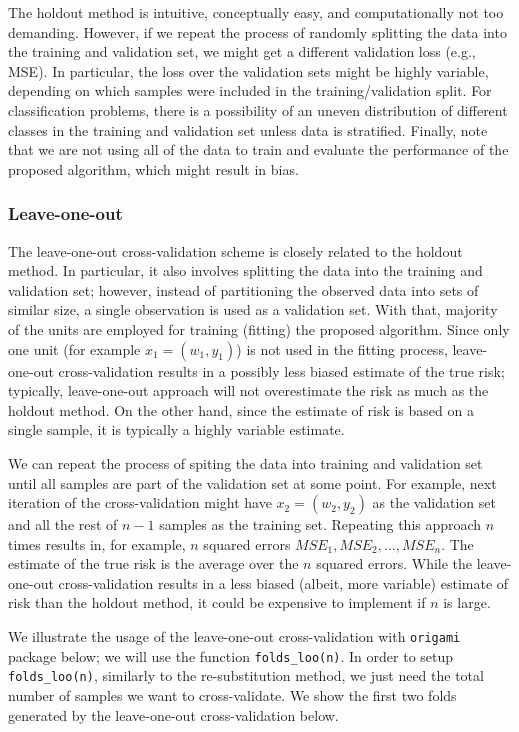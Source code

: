 \documentclass[12pt, krantz2,]{book}
\theoremstyle{definition}
\theoremstyle{definition}
\theoremstyle{definition}
\newcommand{\1}{\mathbbm{1}}
\begin{document}
The holdout method is intuitive, conceptually easy, and computationally not too
demanding. However, if we repeat the process of randomly splitting the data into
the training and validation set, we might get a different validation loss (e.g.,
MSE). In particular, the loss over the validation sets might be highly
variable, depending on which samples were included in the training/validation
split. For classification problems, there is a possibility of an uneven
distribution of different classes in the training and validation set unless data
is stratified. Finally, note that we are not using all of the data to train and
evaluate the performance of the proposed algorithm, which might result in bias.

\hypertarget{leave-one-out}{%
\subsubsection{Leave-one-out}\label{leave-one-out}}

The leave-one-out cross-validation scheme is closely related to the holdout
method. In particular, it also involves splitting the data into the training and
validation set; however, instead of partitioning the observed data into sets of
similar size, a single observation is used as a validation set. With that,
majority of the units are employed for training (fitting) the proposed
algorithm. Since only one unit (for example \(x_1 = (w_1, y_1)\)) is not used in
the fitting process, leave-one-out cross-validation results in a possibly less
biased estimate of the true risk; typically, leave-one-out approach will not
overestimate the risk as much as the holdout method. On the other hand, since
the estimate of risk is based on a single sample, it is typically a highly
variable estimate.

We can repeat the process of spiting the data into training and validation set
until all samples are part of the validation set at some point. For example,
next iteration of the cross-validation might have \(x_2 = (w_2,y_2)\) as the
validation set and all the rest of \(n-1\) samples as the training set. Repeating
this approach \(n\) times results in, for example, \(n\) squared errors \(MSE_1, MSE_2, \ldots, MSE_n\). The estimate of the true risk is the average over the
\(n\) squared errors. While the leave-one-out cross-validation results in a less
biased (albeit, more variable) estimate of risk than the holdout method, it
could be expensive to implement if \(n\) is large.

We illustrate the usage of the leave-one-out cross-validation with \texttt{origami}
package below; we will use the function \texttt{folds\_loo(n)}. In order to setup
\texttt{folds\_loo(n)}, similarly to the re-substitution method, we just need the total
number of samples we want to cross-validate. We show the first two folds
generated by the leave-one-out cross-validation below.
\end{document}
